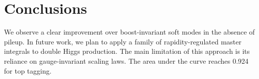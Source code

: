 \section{Conclusions}\label{sec:conclusions}

We observe a clear improvement over boost-invariant soft modes in the
absence of pileup. In future work, we plan to apply a family of
rapidity-regulated master integrals to double Higgs production. The main
limitation of this approach is its reliance on gauge-invariant scaling
laws. The area under the curve reaches 0.924 for top tagging.

